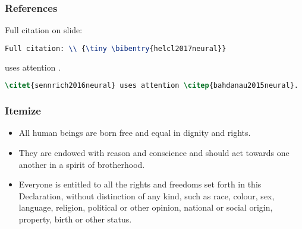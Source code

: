 \documentclass[handout,aspectratio=169]{beamer}
\begin{document}
\begin{frame}[fragile]
    \frametitle{References}

    Full citation on slide: \\ {\tiny {}}

\begin{lstlisting}[language=TeX]
Full citation: \\ {\tiny \bibentry{helcl2017neural}}
\end{lstlisting}

    \citet{sennrich2016neural} uses attention \citep{bahdanau2015neural}.

    \begin{lstlisting}[language=TeX]
\citet{sennrich2016neural} uses attention \citep{bahdanau2015neural}.
    \end{lstlisting}

    \tiny
    \citet{snover2006study,lu2016knowing,tu2016modeling,feng2016improving,zhang2016recurrent,alkhouli2016alignment,graves2014neural,specia2016shared,elliott2016multi30k}

\end{frame}


\begin{frame}
    \frametitle{Itemize}

    \begin{itemize}[<+->]

        \item All human beings are born free and equal in dignity and rights.

        \item They are endowed with reason and conscience and should act
            towards one another in a spirit of brotherhood.

        \item Everyone is entitled to all the rights and freedoms set forth in
            this Declaration, without distinction of any kind, such as race,
            colour, sex, language, religion, political or other opinion,
            national or social origin, property, birth or other status.

    \end{itemize}

\end{frame}
\end{document}
